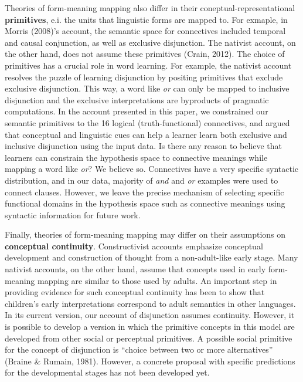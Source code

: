 \documentclass[,man,floatsintext]{apa6}
\begin{document}
Theories of form-meaning mapping also differ in their coneptual-representational \textbf{primitives}, e.i. the units that linguistic forms are mapped to. For exmaple, in Morris (2008)'s account, the semantic space for connectives included temporal and causal conjunction, as well as exclusive disjunction. The nativist account, on the other hand, does not assume these primitives (Crain, 2012). The choice of primitives has a crucial role in word learning. For example, the nativist account resolves the puzzle of learning disjunction by positing primitives that exclude exclusive disjunction. This way, a word like \emph{or} can only be mapped to inclusive disjunction and the exclusive interpretations are byproducts of pragmatic computations. In the account presented in this paper, we constrained our semantic primitives to the 16 logical (truth-functional) connectives, and argued that conceptual and linguistic cues can help a learner learn both exclusive and inclusive disjunction using the input data. Is there any reason to believe that learners can constrain the hypothesis space to connective meanings while mapping a word like \emph{or}? We believe so. Connectives have a very specific syntactic distribution, and in our data, majority of \emph{and} and \emph{or} examples were used to connect clauses. However, we leave the precise mechanism of selecting specific functional domains in the hypothesis space such as connective meanings using syntactic information for future work.

Finally, theories of form-meaning mapping may differ on their assumptions on \textbf{conceptual continuity}. Constructivist accounts emphasize conceptual development and construction of thought from a non-adult-like early stage. Many nativist accounts, on the other hand, assume that concepts used in early form-meaning mapping are similar to those used by adults. An important step in providing evidence for such conceptual continuity has been to show that children's early interpretations correspond to adult semantics in other languages. In its current version, our account of disjunction assumes continuity. However, it is possible to develop a version in which the primitive concepts in this model are developed from other social or perceptual primitives. A possible social primitive for the concept of disjunction is \enquote{choice between two or more alternatives} (Braine \& Rumain, 1981). However, a concrete proposal with specific predictions for the developmental stages has not been developed yet.
\end{document}
